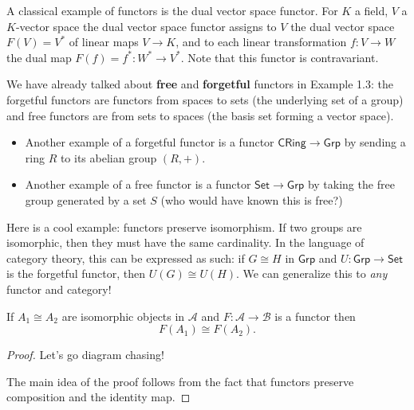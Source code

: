 \begin{example}
    A classical example of functors is the dual vector space functor. For $K$ a field, $V$ a $K$-vector space the dual vector space functor assigns to $V$ the dual vector space $F(V)=V^*$ of linear maps $V\to K$, and to each linear transformation $f \colon V \to W$ the dual map $F(f)=f^* \colon W^* \to V^*$. Note that this functor is contravariant. 
\end{example}
\begin{example}
    We have already talked about \textbf{free} and \textbf{forgetful} functors in Example 1.3: the forgetful functors are functors from spaces to sets (the underlying set of a group) and free functors are from sets to spaces (the basis set forming a vector space).
    \begin{itemize}
        \item Another example of a forgetful functor is a functor $\mathsf{CRing}\to \mathsf{Grp}$ by sending a ring $R$ to its abelian group $(R,+)$.
        \item Another example of a free functor is a functor $\mathsf{Set}\to \mathsf{Grp}$ by taking the free group generated by a set $S$ (who would have known this is free?)
    \end{itemize}
\end{example}
Here is a cool example: functors preserve isomorphism. If two groups are isomorphic, then they must have the same cardinality. In the language of category theory, this can be expressed as such: if $G\cong H$ in $\mathsf{Grp}$ and $U \colon \mathsf{Grp} \to \mathsf{Set}$ is the forgetful functor, then $U(G)\cong U(H)$. We can generalize this to \emph{any} functor and category!
\begin{theorem}
    If $A_1\cong A_2$ are isomorphic objects in $\mathcal{A}$ and $F \colon \mathcal{A} \to \mathcal{B}$ is a functor then \[
        F(A_1)\cong F(A_2).
    \] 
\end{theorem}
\begin{proof}
Let's go diagram chasing!
            \begin{figure}[H]
                \centering
            \end{figure}
The main idea of the proof follows from the fact that functors preserve composition and the identity map. 
\end{proof}
